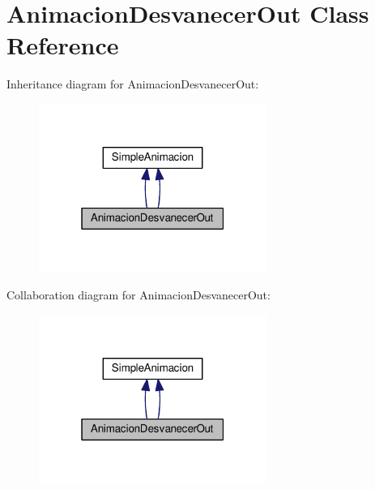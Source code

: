 \hypertarget{class_animacion_desvanecer_out}{}\section{Animacion\+Desvanecer\+Out Class Reference}
\label{class_animacion_desvanecer_out}


Inheritance diagram for Animacion\+Desvanecer\+Out\+:
\nopagebreak
\begin{figure}[H]
\begin{center}
\leavevmode
\includegraphics[width=211pt]{class_animacion_desvanecer_out__inherit__graph}
\end{center}
\end{figure}


Collaboration diagram for Animacion\+Desvanecer\+Out\+:
\nopagebreak
\begin{figure}[H]
\begin{center}
\leavevmode
\includegraphics[width=211pt]{class_animacion_desvanecer_out__coll__graph}
\end{center}
\end{figure}
